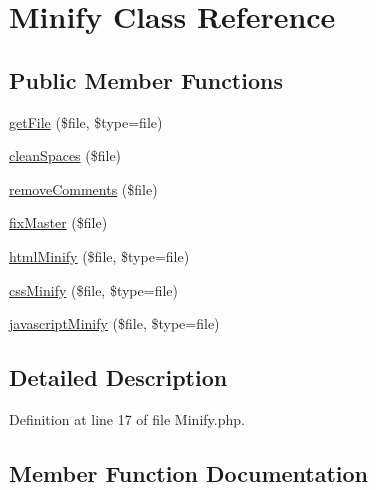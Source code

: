 \hypertarget{class_zest_1_1_common_1_1_minify}{}\section{Minify Class Reference}
\label{class_zest_1_1_common_1_1_minify}
\subsection*{Public Member Functions}
\begin{DoxyCompactItemize}
\item 
\mbox{\hyperlink{class_zest_1_1_common_1_1_minify_a905ce83166cd7dd044a49a0d479c4399}{get\+File}} (\$file, \$type=\textquotesingle{}file\textquotesingle{})
\item 
\mbox{\hyperlink{class_zest_1_1_common_1_1_minify_abf7f7f63348803f74eee2ae6b8d638ff}{clean\+Spaces}} (\$file)
\item 
\mbox{\hyperlink{class_zest_1_1_common_1_1_minify_a009e6f00f6b6f4c1b355e489541ca339}{remove\+Comments}} (\$file)
\item 
\mbox{\hyperlink{class_zest_1_1_common_1_1_minify_a7d9a8f37e357aea7b32979d653e008a7}{fix\+Master}} (\$file)
\item 
\mbox{\hyperlink{class_zest_1_1_common_1_1_minify_a3790247f749067336585a340fa8aba3a}{html\+Minify}} (\$file, \$type=\textquotesingle{}file\textquotesingle{})
\item 
\mbox{\hyperlink{class_zest_1_1_common_1_1_minify_a6be8a6de16be3723cd39f4b41807f1d5}{css\+Minify}} (\$file, \$type=\textquotesingle{}file\textquotesingle{})
\item 
\mbox{\hyperlink{class_zest_1_1_common_1_1_minify_a698373ad4b0e533c71c28fd61660f46c}{javascript\+Minify}} (\$file, \$type=\textquotesingle{}file\textquotesingle{})
\end{DoxyCompactItemize}


\subsection{Detailed Description}


Definition at line 17 of file Minify.\+php.



\subsection{Member Function Documentation}
\mbox{\label{class_zest_1_1_common_1_1_minify_abf7f7f63348803f74eee2ae6b8d638ff}} 
